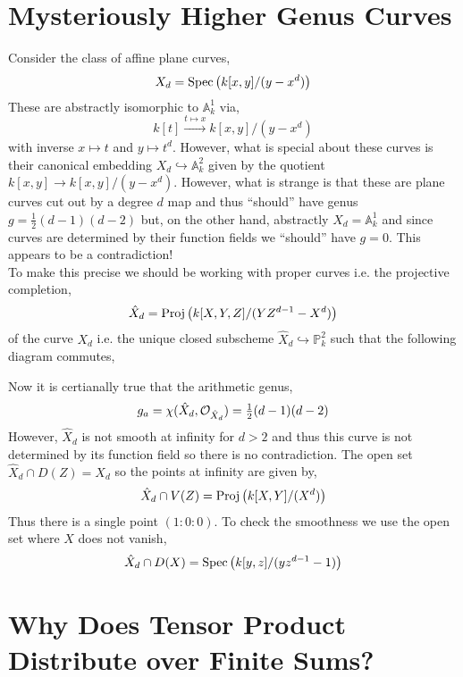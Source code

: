 \documentclass[12pt]{extarticle}
\theoremstyle{definition}
\renewcommand{\P}{\mathbb{P}}
\newcommand{\embed}{\hookrightarrow}
\newcommand{\A}{\mathbb{A}}
\begin{document}
\section{Mysteriously Higher Genus Curves}

\renewcommand{\A}{\mathbb{A}}

Consider the class of affine plane curves,
\[ X_d = \mathrm{Spec}\left(k[x,y]/(y - x^d)\right) \]
These are abstractly isomorphic to $\A^1_k$ via,
\[ k[t] \xrightarrow{t \mapsto x} k[x,y]/(y - x^d) \]
with inverse $x \mapsto t$ and $y \mapsto t^d$. However, what is special about these curves is their canonical embedding $X_d \embed \mathbb{A}^2_k$ given by the quotient $k[x,y] \to k[x,y]/(y  - x^d)$. However, what is strange is that these are plane curves cut out by a degree $d$ map and thus ``should'' have genus $g = \tfrac{1}{2} (d-1)(d-2)$ but, on the other hand, abstractly $X_d = \A^1_k$ and since curves are determined by their function fields we ``should'' have $g = 0$. This appears to be a contradiction!
\bigskip\\
To make this precise we should be working with proper curves i.e. the projective completion,
\[ \hat{X}_d = \mathrm{Proj}\left(k[X,Y,Z]/(Y Z^{d-1} - X^d)\right) \]
of the curve $X_d$ i.e. the unique closed subscheme $\hat{X}_d \embed \P^2_k$ such that the following diagram commutes,
\begin{center}
\end{center}  
Now it is certianally true that the arithmetic genus,
\[ g_a = \chi(\hat{X}_d, \mathcal{O}_{\hat{X}_d}) = \tfrac{1}{2} (d-1)(d-2) \]
However, $\hat{X}_d$ is not smooth at infinity for $d > 2$ and thus this curve is not determined by its function field so there is no contradiction. The open set $\hat{X}_d \cap D(Z) = X_d$ so the points at infinity are given by,
\[ \hat{X}_d \cap V(Z) = \mathrm{Proj}\left(k[X, Y]/(X^d)\right) \]
Thus there is a single point $(1 : 0 : 0)$. To check the smoothness we use the open set where $X$ does not vanish,
\[ \hat{X}_d \cap D(X) = \mathrm{Spec}\left(k[y,z] /(y z^{d-1} - 1)\right) \]



\section{Why Does Tensor Product Distribute over Finite Sums?}
\end{document}
